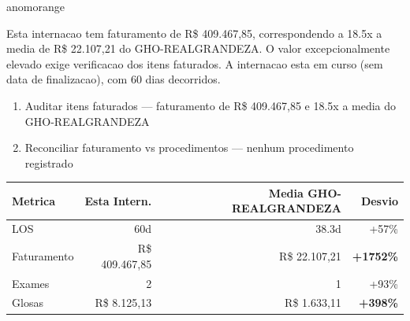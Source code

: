 \documentclass[a4paper,10pt]{article}
\begin{document}
\begin{anomalycard}[Internacao 11421 | GHO-REALGRANDEZA | ALTO (z=4.05)]{anomorange}
\vspace{2pt}\begin{tcolorbox}[colback=severityred!20,colframe=anomorange,title={\textbf{Interpretacao de Negocio}},fonttitle=\bfseries\small,left=4pt,right=4pt,top=3pt,bottom=3pt]
{\small Esta internacao tem faturamento de R\$ 409.467,85, correspondendo a 18.5x a media de R\$ 22.107,21 do GHO-REALGRANDEZA. O valor excepcionalmente elevado exige verificacao dos itens faturados. A internacao esta em curso (sem data de finalizacao), com 60 dias decorridos.}
\end{tcolorbox}
\begin{tcolorbox}[colback=severityyellow!30,colframe=anomorange,title={\textbf{Recomendacoes Especificas}},fonttitle=\bfseries\small,left=4pt,right=4pt,top=3pt,bottom=3pt]
\begin{enumerate}[nosep,leftmargin=16pt]
\item {\small Auditar itens faturados --- faturamento de R\$ 409.467,85 e 18.5x a media do GHO-REALGRANDEZA}
\item {\small Reconciliar faturamento vs procedimentos --- nenhum procedimento registrado}
\end{enumerate}
\end{tcolorbox}
\begin{center}\begin{tabular}{l r r r}\toprule\textbf{Metrica} & \textbf{Esta Intern.} & \textbf{Media GHO-REALGRANDEZA} & \textbf{Desvio} \\\midrule
LOS & 60d & 38.3d & \textcolor{anomorange}{+57\%} \\
Faturamento & R\$ 409.467,85 & R\$ 22.107,21 & \textcolor{anomred}{\textbf{+1752\%}} \\
Exames & 2 & 1 & \textcolor{anomorange}{+93\%} \\
Glosas & R\$ 8.125,13 & R\$ 1.633,11 & \textcolor{anomred}{\textbf{+398\%}} \\
\bottomrule\end{tabular}\end{center}


\end{anomalycard}
\end{document}
